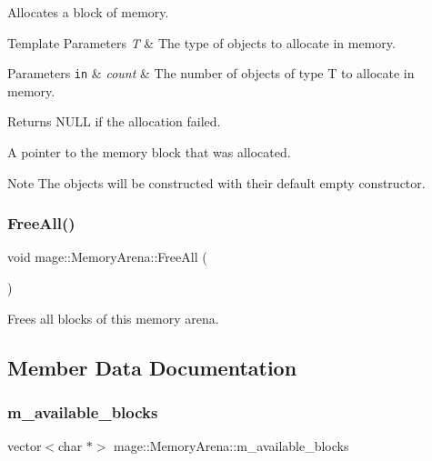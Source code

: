 Allocates a block of memory.


\begin{DoxyTemplParams}{Template Parameters}
{\em T} & The type of objects to allocate in memory. \\
\hline
\end{DoxyTemplParams}

\begin{DoxyParams}[1]{Parameters}
\mbox{\tt in}  & {\em count} & The number of objects of type {\ttfamily T} to allocate in memory. \\
\hline
\end{DoxyParams}
\begin{DoxyReturn}{Returns}
{\ttfamily N\+U\+LL} if the allocation failed. 

A pointer to the memory block that was allocated. 
\end{DoxyReturn}
\begin{DoxyNote}{Note}
The objects will be constructed with their default empty constructor. 
\end{DoxyNote}
\hypertarget{classmage_1_1_memory_arena_a30452ffc5813f5c62232713020fbe405}{}\label{classmage_1_1_memory_arena_a30452ffc5813f5c62232713020fbe405} 
\subsubsection{\texorpdfstring{Free\+All()}{FreeAll()}}
{\footnotesize\ttfamily void mage\+::\+Memory\+Arena\+::\+Free\+All (\begin{DoxyParamCaption}{ }\end{DoxyParamCaption})}

Frees all blocks of this memory arena. 

\subsection{Member Data Documentation}
\hypertarget{classmage_1_1_memory_arena_a2295aae794acabd26ef9c1ff4908b029}{}\label{classmage_1_1_memory_arena_a2295aae794acabd26ef9c1ff4908b029} 
\subsubsection{\texorpdfstring{m\+\_\+available\+\_\+blocks}{m\_available\_blocks}}
{\footnotesize\ttfamily vector$<$char $\ast$$>$ mage\+::\+Memory\+Arena\+::m\+\_\+available\+\_\+blocks\hspace{0.3cm}{\ttfamily [private]}}

